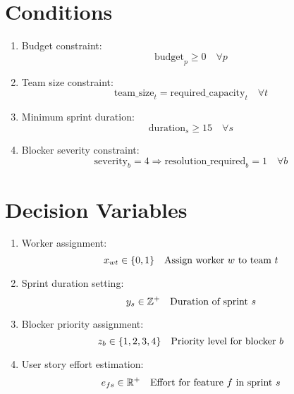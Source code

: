 \documentclass{article}
\begin{document}
\section{Conditions}
\begin{enumerate}
    \item Budget constraint:
    $$ \text{budget}_p \geq 0 \quad \forall p $$
    
    \item Team size constraint:
    $$ \text{team\_size}_t = \text{required\_capacity}_t \quad \forall t $$
    
    \item Minimum sprint duration:
    $$ \text{duration}_s \geq 15 \quad \forall s $$
    
    \item Blocker severity constraint:
    $$ \text{severity}_b = 4 \Rightarrow \text{resolution\_required}_b = 1 \quad \forall b $$
\end{enumerate}

\section{Decision Variables}
\begin{enumerate}
    \item Worker assignment:
    $$ x_{wt} \in \{0,1\} \quad \text{Assign worker $ w $ to team $ t $} $$
    
    \item Sprint duration setting:
    $$ y_s \in \mathbb{Z}^+ \quad \text{Duration of sprint $ s $} $$
    
    \item Blocker priority assignment:
    $$ z_b \in \{1,2,3,4\} \quad \text{Priority level for blocker $ b $} $$
    
    \item User story effort estimation:
    $$ e_{fs} \in \mathbb{R}^+ \quad \text{Effort for feature $ f $ in sprint $ s $} $$
\end{enumerate}
\end{document}
